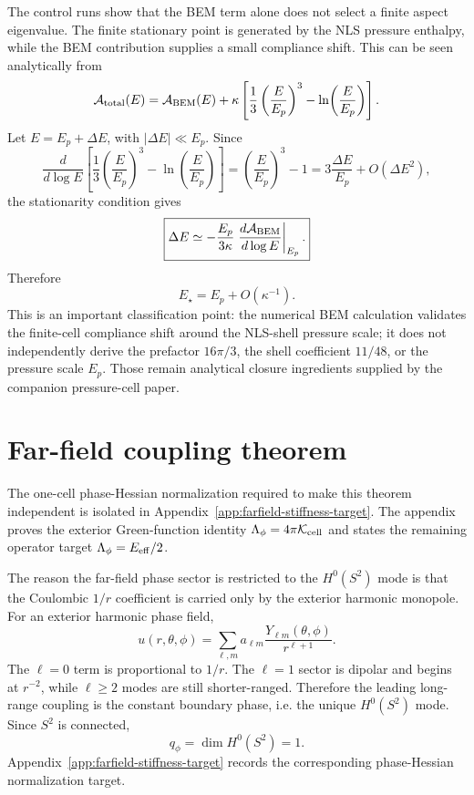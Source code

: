 \documentclass[11pt]{article}
\begin{document}
The control runs show that the BEM term alone does not select a finite aspect
eigenvalue.  The finite stationary point is generated by the NLS pressure
enthalpy, while the BEM contribution supplies a small compliance shift.  This
can be seen analytically from
\begin{equation}
  \mathcal A_{\rm total}(E)
  =
  \mathcal A_{\rm BEM}(E)
  +
  \kappa
  \left[
    \frac{1}{3}\left(\frac{E}{E_p}\right)^3
    -
    \ln\!\left(\frac{E}{E_p}\right)
  \right].
\end{equation}
Let \(E=E_p+\Delta E\), with \(|\Delta E|\ll E_p\).  Since
\begin{equation}
  \frac{d}{d\log E}
  \left[
    \frac{1}{3}\left(\frac{E}{E_p}\right)^3
    -
    \ln\!\left(\frac{E}{E_p}\right)
  \right]
  =
  \left(\frac{E}{E_p}\right)^3-1
  =
  3\frac{\Delta E}{E_p}
  +
  O(\Delta E^2),
\end{equation}
the stationarity condition gives
\begin{equation}
  \boxed{
  \Delta E
  \simeq
  -
  \frac{E_p}{3\kappa}
  \left.
  \frac{d\mathcal A_{\rm BEM}}{d\log E}
  \right|_{E_p}.
  }
  \label{eq:kappa-shift}
\end{equation}
Therefore
\begin{equation}
  E_\star=E_p+O(\kappa^{-1}).
\end{equation}
This is an important classification point: the numerical BEM calculation
validates the finite-cell compliance shift around the NLS-shell pressure scale;
it does not independently derive the prefactor \(16\pi/3\), the shell
coefficient \(11/48\), or the pressure scale \(E_p\).  Those remain analytical
closure ingredients supplied by the companion pressure-cell paper.

\section{Far-field coupling theorem}

The one-cell phase-Hessian normalization required to make this theorem independent is isolated in Appendix~\ref{app:farfield-stiffness-target}. The appendix proves the exterior Green-function identity \(\Lambda_\phi=4\pi\mathcal K_{\rm cell}\) and states the remaining operator target \(\Lambda_\phi=E_{\rm eff}/2\).


The reason the far-field phase sector is restricted to the \(H^0(S^2)\) mode is
that the Coulombic \(1/r\) coefficient is carried only by the exterior harmonic
monopole.  For an exterior harmonic phase field,
\[
  u(r,\theta,\phi)
  =
  \sum_{\ell,m}
  a_{\ell m}\frac{Y_{\ell m}(\theta,\phi)}{r^{\ell+1}}.
\]
The \(\ell=0\) term is proportional to \(1/r\).  The \(\ell=1\) sector is
dipolar and begins at \(r^{-2}\), while \(\ell\ge2\) modes are still
shorter-ranged.  Therefore the leading long-range coupling is the constant
boundary phase, i.e. the unique \(H^0(S^2)\) mode.  Since \(S^2\) is connected,
\[
  q_\phi=\dim H^0(S^2)=1.
\]
Appendix~\ref{app:farfield-stiffness-target} records the corresponding
phase-Hessian normalization target.
\end{document}
